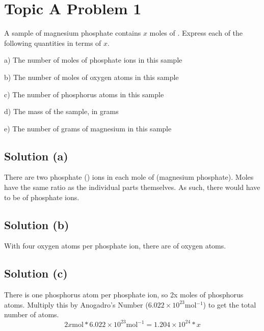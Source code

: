 \documentclass[10pt]{article}
\begin{document}
    \pagebreak
    \section{Topic A Problem 1}
        A sample of magnesium phosphate contains $x$ moles of .
        Express each of the following quantities in terms of $x$.

        a) The number of moles of phosphate ions in this sample
        
        b) The number of moles of oxygen atoms in this sample

        c) The number of phosphorus atoms in this sample

        d) The mass of the sample, in grams

        e) The number of grams of magnesium in this sample

        \subsection{Solution (a)}
            There are two phosphate () ions in each mole of  (magnesium phosphate). 
            Moles have the same ratio as the individual parts themselves. 
            As such, there would have to be  of phosphate ions.

        \subsection{Solution (b)}
            With four oxygen atoms per phosphate ion, there are  of oxygen atoms.

        \subsection{Solution (c)}
            There is one phosphorus atom per phosphate ion, so 2x moles of phosphorus atoms.
            Multiply this by Anogadro's Number ($6.022 \times 10^{23} \unit{\mol^{-1}}$) to get the total number of atoms.
            \begin{equation}
                2x \unit{\mole} * 6.022 \times 10^{23} \unit{\mol^{-1}}
                    =   \boxed{1.204 \times 10^{24} * x}
            \end{equation}
\end{document}
